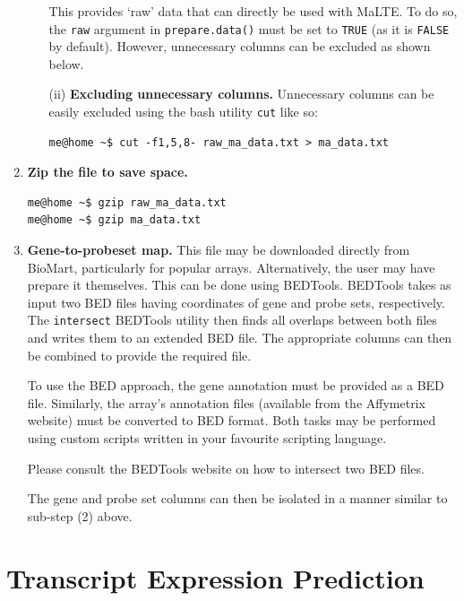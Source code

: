 \documentclass[a4paper,12pt]{article}
\begin{document}
\begin{enumerate}
\begin{enumerate}
This provides `raw' data that can directly be used with \textsf{MaLTE}. To do so, the \texttt{raw} argument in \texttt{prepare.data()} must be set to \texttt{TRUE} (as it is \texttt{FALSE} by default). However, unnecessary columns can be excluded as shown below.

\item[(ii)] \textbf{Excluding unnecessary columns.} Unnecessary columns can be easily excluded using the bash utility \texttt{cut} like so:

\begin{verbatim}
me@home ~$ cut -f1,5,8- raw_ma_data.txt > ma_data.txt
\end{verbatim}

\end{enumerate}

\item \textbf{Zip the file to save space.}
\begin{verbatim}
me@home ~$ gzip raw_ma_data.txt
me@home ~$ gzip ma_data.txt
\end{verbatim}

\item \textbf{Gene-to-probeset map.} This file may be downloaded directly from \textsf{BioMart}, particularly for popular arrays. Alternatively, the user may have prepare it themselves. This can be done using \textsf{BEDTools}. \textsf{BEDTools} takes as input two BED files having coordinates of gene and probe sets, respectively. The \texttt{intersect} \textsf{BEDTools} utility then finds all overlaps between both files and writes them to an extended BED file. The appropriate columns can then be combined to provide the required file.

To use the BED approach, the gene annotation must be provided as a BED file. Similarly, the array's annotation files (available from the Affymetrix website) must be converted to BED format. Both tasks may be performed using custom scripts written in your favourite scripting language.

Please consult the \textsf{BEDTools} website on how to intersect two BED files.

The gene and probe set columns can then be isolated in a manner similar to sub-step (2) above.
\end{enumerate}


\section{Transcript Expression Prediction}
\label{tiep}
\end{document}
